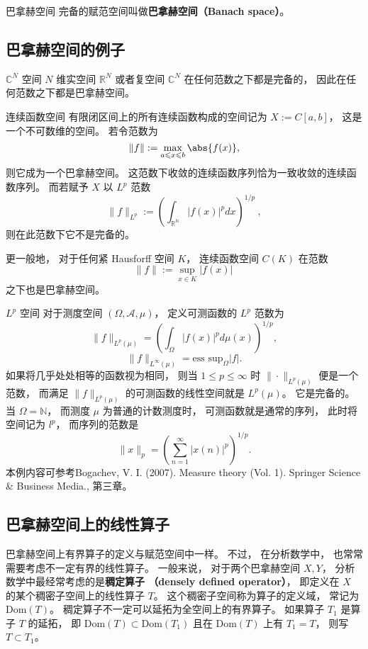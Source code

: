 

\begin{definition}{巴拿赫空间}
完备的赋范空间叫做\textbf{巴拿赫空间（Banach space）}。
\end{definition}

\subsection{巴拿赫空间的例子}
\begin{example}{$\mathbb C^N$ 空间}
$N$ 维实空间 $\mathbb R^N$ 或者复空间 $\mathbb C^N$ 在任何范数之下都是完备的， 因此在任何范数之下都是巴拿赫空间。
\end{example}

\begin{example}{连续函数空间}
有限闭区间上的所有连续函数构成的空间记为 $X := C[a, b]$， 这是一个不可数维的空间。 若令范数为
$$
\|{f}\|:= \max_{a \leqslant x \leqslant b} \abs{f(x)},
$$
则它成为一个巴拿赫空间。 这范数下收敛的连续函数序列恰为一致收敛的连续函数序列。 而若赋予 $X$ 以 $L^p$ 范数
$$
\|f\|_{L^p}:=\left(\int_{\mathbb{R^N}}|f(x)|^pdx\right)^{1/p}~,
$$
则在此范数下它不是完备的。

更一般地， 对于任何紧 Hausforff 空间 $K$， 连续函数空间 $C(K)$ 在范数
$$
\|f\|:=\sup_{x\in K}|f(x)|~
$$
之下也是巴拿赫空间。
\end{example}

\begin{example}{$L^p$ 空间}
对于测度空间 $(\Omega,\mathcal{A},\mu)$， 定义可测函数的 $L^p$ 范数为
$$
\|f\|_{L^p(\mu)}=\left(\int_\Omega |f(x)|^pd\mu(x)\right)^{1/p},
$$
$$
\|f\|_{L^\infty(\mu)}=\text{ess sup}_{\Omega}|f|.
$$
如果将几乎处处相等的函数视为相同， 则当 $1\leq p\leq\infty$ 时 $\|\cdot\|_{L^p(\mu)}$ 便是一个范数， 而满足 $\|f\|_{L^p(\mu)}$ 的可测函数的线性空间就是 $L^p(\mu)$。 它是完备的。 当 $\Omega=\mathbb{N}$， 而测度 $\mu$ 为普通的计数测度时， 可测函数就是通常的序列， 此时将空间记为 $l^p$， 而序列的范数是
$$
\|x\|_p=\left(\sum_{n=1}^\infty|x(n)|^p\right)^{1/p}.
$$
本例内容可参考Bogachev, V. I. (2007). Measure theory (Vol. 1). Springer Science \& Business Media., 第三章。
\end{example}

\subsection{巴拿赫空间上的线性算子}
巴拿赫空间上有界算子的定义与赋范空间中一样。 不过， 在分析数学中， 也常常需要考虑不一定有界的线性算子。 一般来说， 对于两个巴拿赫空间 $X,Y$， 分析数学中最经常考虑的是\textbf{稠定算子 （densely defined operator）}， 即定义在 $X$ 的某个稠密子空间上的线性算子 $T$。 这个稠密子空间称为算子的定义域， 常记为 $\text{Dom}(T)$。 稠定算子不一定可以延拓为全空间上的有界算子。 如果算子 $T_1$ 是算子 $T$ 的延拓， 即 $\text{Dom}(T)\subset \text{Dom}(T_1)$ 且在 $\text{Dom}(T)$ 上有 $T_1=T$， 则写 $T\subset T_1$。

